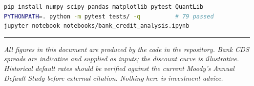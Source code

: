 \documentclass[11pt,a4paper]{article}
\begin{document}
\begin{lstlisting}[language=bash]
pip install numpy scipy pandas matplotlib pytest QuantLib
PYTHONPATH=. python -m pytest tests/ -q          # 79 passed
jupyter notebook notebooks/bank_credit_analysis.ipynb
\end{lstlisting}

\vspace{2em}
\hrule
\vspace{0.8em}
{\small\itshape
All figures in this document are produced by the code in the repository. Bank CDS spreads are
indicative and supplied as inputs; the discount curve is illustrative. Historical default rates
should be verified against the current Moody's Annual Default Study before external citation.
Nothing here is investment advice.}
\end{document}
